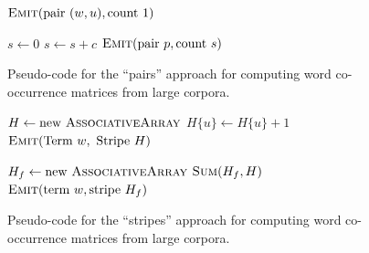 \begin{figure}[p]
\algrenewcommand{}
\algrenewcommand{}
  \begin{algorithmic}[1]
    \State $\textsc{Emit}(\textrm{pair }(w,u), \textrm{count }1)$
    \EndFor
    \EndFor
    \EndProcedure
    \EndFunction
  \end{algorithmic}

  \begin{algorithmic}[1]
    \State $s \gets 0$
    \State $s \gets s + c$
    \EndFor
    \State $\textsc{Emit}(\textrm{pair }p, \textrm{count }s)$
    \EndProcedure
    \EndFunction
  \end{algorithmic}
  \caption{Pseudo-code for the ``pairs'' approach for computing word
    co-occurrence matrices from large corpora.}
\label{figure:chapter3:coocur:pairs}
\end{figure}

\begin{figure}[p]
\algrenewcommand{}
\algrenewcommand{}
  \begin{algorithmic}[1]
    \State $H \gets \textrm{new }\textsc{AssociativeArray}$
    \State $H\{u\} \gets H\{u\} + 1$
    \EndFor
    \State $\textsc{Emit}(\textrm{Term }w, \textrm{ Stripe }H)$
    \EndFor
    \EndProcedure
    \EndFunction
  \end{algorithmic}

  \begin{algorithmic}[1]
    \State $H_f \gets \textrm{new }\textsc{AssociativeArray}$
    \State $\textsc{Sum}(H_f,H)$
    \EndFor
    \State $\textsc{Emit}(\textrm{term }w, \textrm{stripe }H_f)$
    \EndProcedure
    \EndFunction
  \end{algorithmic}
  \caption{Pseudo-code for the ``stripes'' approach for computing word
    co-occurrence matrices from large corpora.}
\label{figure:chapter3:coocur:stripes}
\end{figure}

